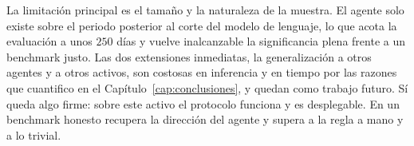 La limitación principal es el tamaño y la naturaleza de la muestra. El agente solo existe sobre el periodo posterior al corte del modelo de lenguaje, lo que acota la evaluación a unos $250$ días y vuelve inalcanzable la significancia plena frente a un benchmark justo. Las dos extensiones inmediatas, la generalización a otros agentes y a otros activos, son costosas en inferencia y en tiempo por las razones que cuantifico en el Capítulo~\ref{cap:conclusiones}, y quedan como trabajo futuro. Sí queda algo firme: sobre este activo el protocolo funciona y es desplegable. En un benchmark honesto recupera la dirección del agente y supera a la regla a mano y a lo trivial.
